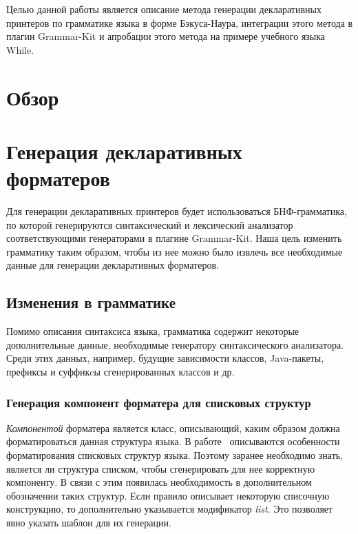 \documentclass[conference]{IEEEtran}
\begin{document}
Целью данной работы является описание метода генерации декларативных принтеров по грамматике языка в форме Бэкуса-Наура, интеграции этого метода в плагин Grammar-Kit и апробации этого метода на примере учебного языка While.


\section{Обзор}



\section{Генерация декларативных форматеров}
Для генерации декларативных принтеров будет использоваться БНФ-грамматика, по которой генерируются синтаксический и лексический анализатор соответствующими генераторами в плагине Grammar-Kit.
Наша цель изменить грамматику таким образом, чтобы из нее можно было извлечь все необходимые данные для генерации декларативных форматеров.
\subsection{Изменения в грамматике}
Помимо описания синтаксиса языка, грамматика содержит некоторые дополнительные данные, необходимые генератору синтаксического анализатора.
Среди этих данных, например, будущие зависимости классов, Java-пакеты, префиксы и суффикcы сгенерированных классов и др.

\subsubsection*{Генерация компонент форматера для списковых структур}
\emph{Компонентой} форматера является класс, описывающий, каким образом должна форматироваться данная структура языка.
В работе~\cite{while} описываются особенности форматирования списковых структур языка.
Поэтому заранее необходимо знать, является ли структура списком, чтобы сгенерировать для нее корректную компоненту.
В связи с этим появилась необходимость в дополнительном обозначении таких структур.
Если правило описывает некоторую списочную конструкцию, то дополнительно указывается модификатор \emph{list}.
Это позволяет явно указать шаблон для их генерации.
\end{document}
